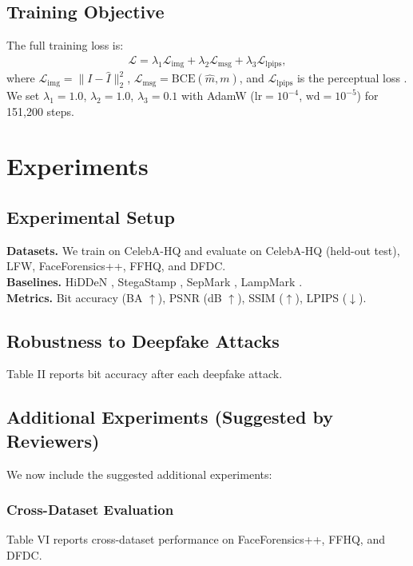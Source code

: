 \documentclass{article}
\begin{document}
\subsection{Training Objective}
The full training loss is:
\begin{align}
\mathcal{L} = \lambda_1 \mathcal{L}_{\text{img}} + \lambda_2 \mathcal{L}_{\text{msg}} + \lambda_3 \mathcal{L}_{\text{lpips}},
\end{align}
where $\mathcal{L}_{\text{img}} = \|I - \hat{I}\|_2^2$, $\mathcal{L}_{\text{msg}} = \text{BCE}(\hat{m}, m)$, and $\mathcal{L}_{\text{lpips}}$ is the perceptual loss \cite{zhang2018lpips}. We set $\lambda_1=1.0$, $\lambda_2=1.0$, $\lambda_3=0.1$ with AdamW ($\text{lr}=10^{-4}$, $\text{wd}=10^{-5}$) for 151,200 steps.

\section{Experiments}

\subsection{Experimental Setup}
\textbf{Datasets.} We train on CelebA-HQ and evaluate on CelebA-HQ (held-out test), LFW, FaceForensics++, FFHQ, and DFDC.
\\
\textbf{Baselines.} HiDDeN \cite{zhu2018hidden}, StegaStamp \cite{tancik2020stegastamp}, SepMark \cite{wu2023sepmark}, LampMark \cite{wang2024lampmark}.
\\
\textbf{Metrics.} Bit accuracy (BA $\uparrow$), PSNR (dB $\uparrow$), SSIM ($\uparrow$), LPIPS ($\downarrow$).

\subsection{Robustness to Deepfake Attacks}
Table II reports bit accuracy after each deepfake attack.

\subsection{Additional Experiments (Suggested by Reviewers)}
We now include the suggested additional experiments:

\subsubsection{Cross-Dataset Evaluation}
Table VI reports cross-dataset performance on FaceForensics++, FFHQ, and DFDC.
\end{document}
